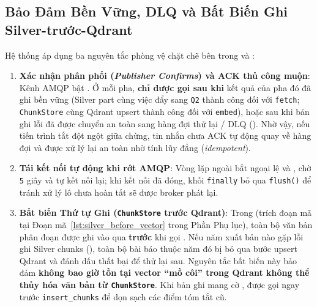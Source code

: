 \subsection{Bảo Đảm Bền Vững, DLQ và Bất Biến Ghi Silver-trước-Qdrant}
\label{sec:ch2_silver_before_qdrant}

Hệ thống áp dụng ba nguyên tắc phòng vệ chặt chẽ bên trong  và :
\begin{enumerate}[label=\textbf{\arabic*.}]
  \item \textbf{Xác nhận phân phối (\textit{Publisher Confirms}) và ACK thủ công muộn}: Kênh AMQP bật . Ở mỗi pha,  \textbf{chỉ được gọi sau khi} kết quả của pha đó đã ghi bền vững (Silver part cùng việc đẩy sang \texttt{Q2} thành công đối với \texttt{fetch}; \texttt{ChunkStore} cùng Qdrant upsert thành công đối với \texttt{embed}), hoặc sau khi bản ghi lỗi đã được chuyển an toàn sang hàng đợi thử lại / DLQ (). Nhờ vậy, nếu tiến trình tắt đột ngột giữa chừng, tin nhắn chưa ACK tự động quay về hàng đợi và được xử lý lại an toàn nhờ tính lũy đẳng (\textit{idempotent}).
  \item \textbf{Tái kết nối tự động khi rớt AMQP}: Vòng lặp ngoài  bắt ngoại lệ  và , chờ \texttt{5} giây và tự kết nối lại; khi kết nối đã đóng, khối \texttt{finally} bỏ qua \texttt{flush()} để tránh xử lý lô chưa hoàn tất sẽ được broker phát lại.
  \item \textbf{Bất biến Thứ tự Ghi (\texttt{ChunkStore} trước Qdrant)}: Trong  (trích đoạn mã tại Đoạn mã~\ref{lst:silver_before_vector} trong Phần Phụ lục), toàn bộ văn bản phân đoạn được ghi vào  qua  \textbf{trước} khi gọi . Nếu năm xuất bản nào gặp lỗi ghi Silver chunks (), toàn bộ bài báo thuộc năm đó bị bỏ qua bước upsert Qdrant và đánh dấu thất bại để thử lại sau. Nguyên tắc bất biến này bảo đảm \textbf{không bao giờ tồn tại vector ``mồ côi'' trong Qdrant không thể thủy hóa văn bản từ \texttt{ChunkStore}}. Khi bản ghi mang cờ ,  được gọi ngay trước \texttt{insert\_chunks} để dọn sạch các điểm tóm tắt cũ.
\end{enumerate}
\FloatBarrier
